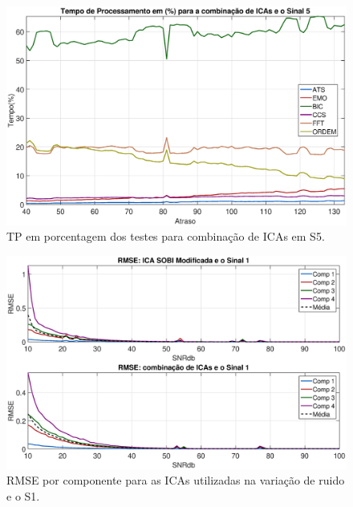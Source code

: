 \documentclass[a4paper,12pt]{monografia}
\theoremstyle{plain}
\theoremstyle{definition}
\theoremstyle{remark}
\begin{document}
\begin{figure}[!htb]
    \begin{center}
    \advance\leftskip -1.5cm
    \includegraphics[scale=0.45]{imagens/ImagensParaOAnexo/TPPACombinacaoICASinal5.eps}
    \caption{TP em porcentagem dos testes para combinação de ICAs em S5.}
    \label{fig:TPCIAS5}    
    \end{center}
\end{figure}

\begin{figure}[!htb]
    \begin{center}
    \advance\leftskip -1.5cm
    \includegraphics[scale=0.45]{imagens/ImagensParaOAnexo/RMSEcompRTodasICAsSinal1.eps}
    \caption{RMSE por componente para as ICAs utilizadas na variação de ruido e o S1.}
    \label{fig:RMSERS1}    
    \end{center}
\end{figure}
\end{document}
